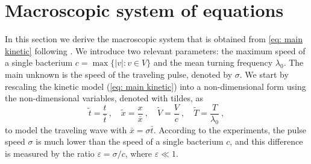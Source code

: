 \documentclass[11pt,twoside]{article}
\numberwithin{equation}{section}
\theoremstyle{plain}
\theoremstyle{nonumberplain}
\begin{document}
\section{Macroscopic system of equations}\label{sec: maro system}
In this section we derive the macroscopic system that is obtained from \eqref{eq: main kinetic} following \cite{saragosti2010mathematical}. We introduce two relevant parameters: the maximum speed of a single bacterium $c = \max\{|v|: v \in V\}$ and the mean turning frequency $\lambda_0$.
The main unknown is the speed of the traveling pulse, denoted by $\sigma$. We start by rescaling the kinetic model (\ref{eq: main kinetic}) into a non-dimensional form using the non-dimensional variables, denoted with tildes, as
\begin{equation}
    \tilde{t}= \frac{{t}}{\bar{t}}\ , \quad \tilde{x} = \frac{x}{\bar{x}}\ , \quad {\tilde{V} = \frac{V}{c}}\ , \quad \tilde{T}=\frac{T}{\lambda_0}\ ,
    \nonumber
\end{equation}
to model the traveling wave with $\bar{x} = \sigma\bar{t}$. According to the experiments, the pulse
speed $\sigma$ is much lower than the speed of a single bacterium $c$, and this difference is measured by the ratio $\varepsilon = \sigma / c$, where $\varepsilon \ll 1$.
\end{document}
